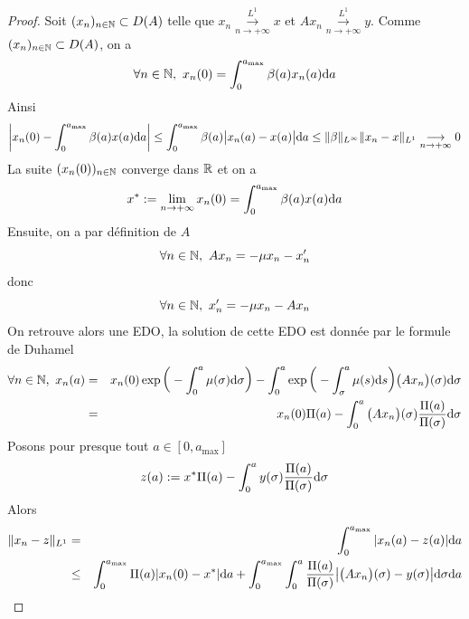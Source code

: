 \begin{proof}
    Soit $(x_n)_{n \in \mathbb{N}} \subset D(A)$ telle que $x_n \overset{L^1}{\underset{n \to +\infty}{\longrightarrow}} x$ et $Ax_n \overset{L^1}{\underset{n \to +\infty}{\longrightarrow}} y$. Comme $(x_n)_{n \in \mathbb{N}} \subset D(A)$, on a 
    \begin{equation*}
        \forall n \in \bbN, \ x_n(0)=\int_0^{a_{\max}}\beta(a)x_n(a)\d a
    \end{equation*}
    Ainsi
    \begin{eqnarray*}
        \bigg|x_n(0) - \int_0^{a_{\max}} \beta(a)x(a)\mathrm{d} a\bigg| \leq \int_0^{a_{\max}} \beta(a)\big|x_n(a)-x(a)\big|\mathrm{d} a
        \leq \|\beta\|_{L^{\infty}}\|x_n-x\|_{L^1}\underset{n \to +\infty}{\longrightarrow} 0
    \end{eqnarray*}
    La suite $(x_n(0))_{n \in \mathbb{N}}$ converge dans $\mathbb{R}$ et on a 
    \begin{equation*}
        x^*:=\lim_{n \to +\infty} x_n(0) = \int_0^{a_{\max}} \beta(a)x(a)\mathrm{d} a
    \end{equation*}
    Ensuite, on a par définition de $A$
    \begin{equation*}
        \forall n \in \mathbb{N}, \ Ax_n = -\mu x_n - x_n'
    \end{equation*}
    donc
    \begin{equation*}
        \forall n \in \bbN, \ x_n' = -\mu x_n -Ax_n
    \end{equation*}
    On retrouve alors une EDO, la solution de cette EDO est donnée par le formule de Duhamel 
    \begin{eqnarray*}
        \forall n \in \mathbb{N}, \ x_n(a) &=& x_n(0)\exp\bigg(-\int_0^a \mu(\sigma)\mathrm{d} \sigma\bigg) - \int_0^a \exp\bigg(-\int_{\sigma}^a \mu(s)\mathrm{d} s\bigg)\big(Ax_n\big)(\sigma)\mathrm{d} \sigma \\
        &=& x_n(0)\Pi(a) - \int_0^a\big(Ax_n\big)(\sigma)\frac{\Pi(a)}{\Pi(\sigma)}\mathrm{d} \sigma
    \end{eqnarray*}
    Posons pour presque tout $a \in [0,a_{\max}]$
    \begin{equation*}
        z(a):= x^*\Pi(a) - \int_0^ay(\sigma)\frac{\Pi(a)}{\Pi(\sigma)}\mathrm{d} \sigma
    \end{equation*}
    Alors 
    \begin{eqnarray*}
        \|x_n-z\|_{L^1} &=& \int_0^{a_{\max}}|x_n(a)-z(a)|\d a \\
        &\leq& \int_0^{a_{\max}} \Pi(a)|x_n(0)-x^*|\d a +\int_0^{a_{\max}} \int_0^a \frac{\Pi(a)}{\Pi(\sigma)}\big|\big(Ax_n\big)(\sigma) - y(\sigma)\big|\d \sigma \d a \\

\end{eqnarray*}
\end{proof}
